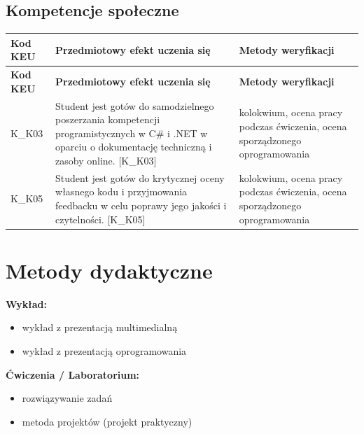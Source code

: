 \documentclass[12pt, a4paper]{article}
\newcommand{\thdrule}{\noalign{\global\setlength{\extrarowheight}{0pt}}}
\newcommand{\thdend}{\noalign{\global\setlength{\extrarowheight}{3pt}}}
\begin{document}
\subsection*{Kompetencje społeczne}
{\scriptsize
\begin{longtable}{m{1.6cm}m{9.0cm}m{4.2cm}}
\thdrule\toprule
\rowcolor{pjatkRed} {\color{white}\footnotesize\textbf{\vphantom{Ag}Kod KEU}} & {\color{white}\footnotesize\textbf{\vphantom{Ag}Przedmiotowy efekt uczenia się}} & {\color{white}\footnotesize\textbf{\vphantom{Ag}Metody weryfikacji}} \\
\midrule\thdend
\endfirsthead
\thdrule\toprule
\rowcolor{pjatkRed} {\color{white}\footnotesize\textbf{\vphantom{Ag}Kod KEU}} & {\color{white}\footnotesize\textbf{\vphantom{Ag}Przedmiotowy efekt uczenia się}} & {\color{white}\footnotesize\textbf{\vphantom{Ag}Metody weryfikacji}} \\
\midrule\thdend
\endhead
  \rowcolor{tableRowLight} K\_K03 & Student jest gotów do samodzielnego poszerzania kompetencji programistycznych w C\# i .NET w oparciu o dokumentację techniczną i zasoby online. {[}K\_K03{]} & kolokwium, ocena pracy podczas ćwiczenia, ocena sporządzonego oprogramowania \\
  \rowcolor{tableRowAlt} K\_K05 & Student jest gotów do krytycznej oceny własnego kodu i przyjmowania feedbacku w celu poprawy jego jakości i czytelności. {[}K\_K05{]} & kolokwium, ocena pracy podczas ćwiczenia, ocena sporządzonego oprogramowania \\
\bottomrule
\end{longtable}}

\section{Metody dydaktyczne}

\textbf{Wykład:}
\begin{itemize}
  \item wykład z prezentacją multimedialną
  \item wykład z prezentacją oprogramowania
\end{itemize}
\vspace{4pt}
\textbf{Ćwiczenia / Laboratorium:}
\begin{itemize}
  \item rozwiązywanie zadań
  \item metoda projektów (projekt praktyczny)
\end{itemize}
\vspace{4pt}
\end{document}
